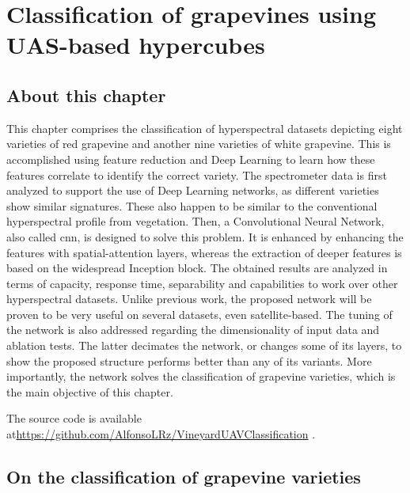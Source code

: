 \setchapterpreamble[u]{\margintoc}
\chapter{Classification of grapevines using UAS-based hypercubes}
\label{sec:vineyard_classification}

\section*{About this chapter}

This chapter comprises the classification of hyperspectral datasets depicting eight varieties of red grapevine and another nine varieties of white grapevine. This is accomplished using feature reduction and Deep Learning to learn how these features correlate to identify the correct variety. The spectrometer data is first analyzed to support the use of Deep Learning networks, as different varieties show similar signatures. These also happen to be similar to the conventional hyperspectral profile from vegetation. Then, a Convolutional Neural Network, also called \acrshort{cnn}, is designed to solve this problem. It is enhanced by enhancing the features with spatial-attention layers, whereas the extraction of deeper features is based on the widespread Inception block. The obtained results are analyzed in terms of capacity, response time, separability and capabilities to work over other hyperspectral datasets. Unlike previous work, the proposed network will be proven to be very useful on several datasets, even satellite-based. The tuning of the network is also addressed regarding the dimensionality of input data and ablation tests. The latter decimates the network, or changes some of its layers, to show the proposed structure performs better than any of its variants. More importantly, the network solves the classification of grapevine varieties, which is the main objective of this chapter.

The source code is available at\newline \footnotesize\url{https://github.com/AlfonsoLRz/VineyardUAVClassification} \normalsize.

\section{On the classification of grapevine varieties}

